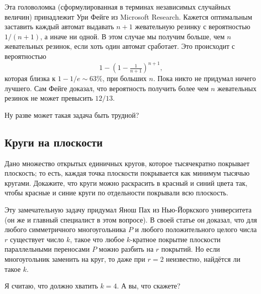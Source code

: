 \medskip

Эта головоломка (сформулированная в терминах независимых случайных величин) принадлежит Ури Фейге из Microsoft Research.
Кажется оптимальным заставить каждый автомат выдавать $n + 1$ жевательную резинку с вероятностью $1/(n + 1)$,
а иначе ни одной.
В этом случае мы получим больше, чем $n$ жевательных резинок, если хоть один автомат сработает.
Это происходит с вероятностью
\[1-(1-\tfrac1{n+1})^{n+1},\]
которая близка к $1 - 1/e \sim 63\%$, при больших $n$.
Пока никто не придумал ничего лучшего.
Сам Фейге доказал, что вероятность получить более чем $n$ жевательных резинок не может превысить $12/13$.

Ну разве может такая задача быть трудной?

\subsection*{Круги на плоскости}

Дано множество открытых единичных кругов, которое тысячекратно покрывает плоскость;
то есть, каждая точка плоскости покрывается как минимум тысячью кругами.
Докажите, что круги можно раскрасить в красный и синий цвета так,
чтобы красные и синие круги по отдельности покрывали всю плоскость.

\medskip

Эту замечательную задачу придумал Янош Пах из Нью-Йоркского университета (он же и главный специалист в этом вопросе).
В своей статье \cite{46} он доказал, что для любого симметричного многоугольника $P$ и любого положительного целого числа $r$ существует число $k$, такое что любое $k$-кратное покрытие плоскости параллельными переносами $P$ можно разбить на $r$ покрытий.
Но если многоугольник заменить на круг, то даже при $r = 2$ неизвестно, найдётся ли такое $k$.

Я считаю, что должно хватить $k = 4$.
А вы, что скажете?
